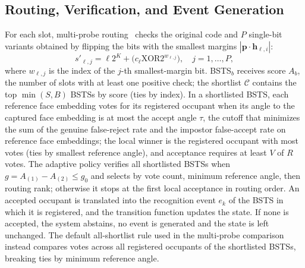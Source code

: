 \documentclass[pdflatex,sn-mathphys-num]{sn-jnl}%
\theoremstyle{thmstyleone}%
\theoremstyle{thmstyletwo}%
\theoremstyle{thmstylethree}%
\begin{document}
\subsection{Routing, Verification, and Event Generation}\label{sec:escalation}
For each slot, multi-probe routing~\cite{lv2007} checks the original code and $P$ single-bit variants obtained by flipping the bits with the smallest margins $|\mathbf{p}\cdot\mathbf{h}_{\ell,i}|$:
\begin{equation}
s'_{\ell,j}=\ell2^K+\bigl(c_\ell\mathbin{\mathrm{XOR}}2^{w_{\ell,j}}\bigr),\quad j=1,\ldots,P,
\label{eq:multi-probe}
\end{equation}
where $w_{\ell,j}$ is the index of the $j$-th smallest-margin bit. BSTS$_b$ receives score $A_b$, the number of slots with at least one positive check; the shortlist $\mathcal{C}$ contains the top $\min(S,B)$ BSTSs by score (ties by index). In a shortlisted BSTS, each reference face embedding votes for its registered occupant when its angle to the captured face embedding is at most the accept angle $\tau$, the cutoff that minimizes the sum of the genuine false-reject rate and the impostor false-accept rate on reference face embeddings; the local winner is the registered occupant with most votes (ties by smallest reference angle), and acceptance requires at least $V$ of $R$ votes. The adaptive policy verifies all shortlisted BSTSs when $g=A_{(1)}-A_{(2)}\leq g_0$ and selects by vote count, minimum reference angle, then routing rank; otherwise it stops at the first local acceptance in routing order. An accepted occupant is translated into the recognition event $e_k$ of the BSTS in which it is registered, and the transition function updates the state. If none is accepted, the system abstains, no event is generated and the state is left unchanged. The default all-shortlist rule used in the multi-probe comparison instead compares votes across all registered occupants of the shortlisted BSTSs, breaking ties by minimum reference angle.
\end{document}

